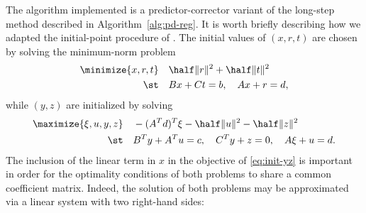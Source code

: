 \documentclass{amsart}
\begin{document}
The algorithm implemented is a predictor-corrector variant of the long-step
method described in Algorithm~\ref{alg:pd-reg}. It is worth briefly describing
how we adapted the initial-point procedure of \cite{mehrotra-1992}. The initial
values of $(x,r,t)$ are chosen by solving the minimum-norm problem
\begin{equation}
  \label{eq:init-xrt}
  \begin{aligned}
    \minimize{x, r, t} \quad & \half \|r\|^2 + \half \|t\|^2 \\
    \st \quad & Bx + Ct = b, \quad Ax + r = d,
  \end{aligned}
\end{equation}
while $(y,z)$ are initialized by solving
\begin{equation}
  \label{eq:init-yz}
  \begin{aligned}
    \maximize{\xi, u, y, z} \quad &
      - (A^T d)^T \xi - \half \|u\|^2 - \half \|z\|^2 \\
    \st \quad & B^T y + A^T u = c, \quad
                C^T y + z = 0, \quad
                A \xi + u = d.
  \end{aligned}
\end{equation}
The inclusion of the linear term in $x$ in the objective of \eqref{eq:init-yz}
is important in order for the optimality conditions of both problems to share
a common coefficient matrix. Indeed, the solution of both problems may be
approximated via a linear system with two right-hand sides:
\end{document}
